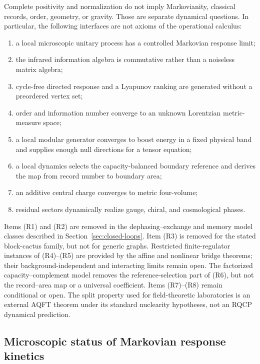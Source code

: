 \documentclass[11pt]{article}
\begin{document}
Complete positivity and normalization do not imply Markovianity, classical
records, order, geometry, or gravity.  Those are separate dynamical
questions.  In particular, the following interfaces are not axioms of the
operational calculus:
\begin{enumerate}[label=(R\arabic*)]
\item a local microscopic unitary process has a controlled Markovian response
limit;
\item the infrared information algebra is commutative rather than a noiseless
matrix algebra;
\item cycle-free directed response and a Lyapunov ranking are generated
without a preordered vertex set;
\item order and information number converge to an unknown Lorentzian
metric-measure space;
\item a local modular generator converges to boost energy in a fixed physical
band and supplies enough null directions for a tensor equation;
\item a local dynamics selects the capacity-balanced boundary reference and
derives the map from record number to boundary area;
\item an additive central charge converges to metric four-volume;
\item residual sectors dynamically realize gauge, chiral, and cosmological
phases.
\end{enumerate}
Items (R1) and (R2) are removed in the dephasing--exchange and memory model
classes described in Section~\ref{sec:closed-loops}.  Item (R3) is removed
for the stated block-cactus family, but not for generic graphs.  Restricted
finite-regulator instances of (R4)--(R5) are provided by the affine and
nonlinear bridge theorems; their background-independent and interacting
limits remain open.  The factorized capacity--complement model removes the
reference-selection part of (R6), but not the record--area map or a universal
coefficient.  Items (R7)--(R8) remain conditional or open.  The split
property used for
field-theoretic laboratories is an external AQFT theorem under its standard
nuclearity hypotheses, not an RQCP dynamical prediction.

\subsection{Microscopic status of Markovian response kinetics}
\end{document}
